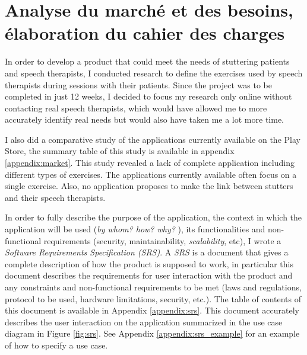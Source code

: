 
\section{Analyse du marché et des besoins, élaboration du cahier des charges}
In order to develop a product that could meet the needs of stuttering patients and speech therapists, I conducted research to define the exercises used by speech therapists during sessions with their patients. Since the project was to be completed in just 12 weeks, I decided to focus my research only online without contacting real speech therapists, which would have allowed me to more accurately identify real needs but would also have taken me a lot more time.

I also did a comparative study of the applications currently available on the Play Store, the summary table of this study is available in appendix \ref{appendix:market}. This study revealed a lack of complete application including different types of exercises. The applications currently available often focus on a single exercise. Also, no application proposes to make the link between stutters and their speech therapists.

In order to fully describe the purpose of the application, the context in which the application will be used (\textit{by whom? how? why? }), its functionalities and non-functional requirements (security, maintainability, \textit{scalability}, etc), I wrote a \textit{Software Requirements Specification (SRS)}. A \textit{SRS} is a document that gives a complete description of how the product is supposed to work, in particular this document describes the requirements for user interaction with the product and any constraints and non-functional requirements to be met (laws and regulations, protocol to be used, hardware limitations, security, etc.). The table of contents of this document is available in Appendix \ref{appendix:srs}. This document accurately describes the user interaction on the application summarized in the use case diagram in Figure \ref{fig:srs}. See Appendix \ref{appendix:srs_example} for an example of how to specify a use case.

